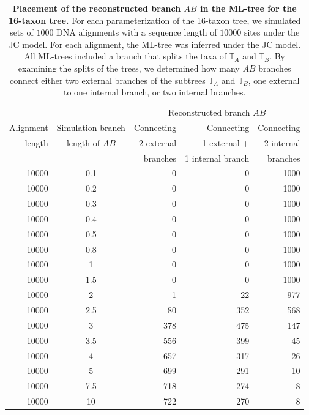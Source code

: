\begin{appendices}
\begin{table}[hb]
    \centering
    \begin{tabular}{|r|c|r|r|r|}
\hline
      &  &\multicolumn{3}{c|}{Reconstructed branch $AB$}\\
Alignment &Simulation branch&   Connecting  & Connecting &  Connecting\\
length &length of $AB$ &     2 external & 1 external +  & 2 internal \\
&&     branches & 1 internal branch & branches\\
\hline
10000 &0.1	&  0	& 0  & 1000 \\
10000 &0.2	&  0	& 0  & 1000 \\
10000 &0.3	&  0	& 0  & 1000 \\
10000 &0.4	&  0	& 0  & 1000 \\
10000 &0.5	&  0	& 0  & 1000 \\
10000 &0.8	&  0   	& 0  & 1000 \\
10000 &1   	&  0   	& 0  & 1000 \\
10000 &1.5	& 0   	& 0  & 1000 \\
10000 &2  	& 1	    &22  &977 \\
10000 &2.5	&80	    &352 &568 \\
10000 &3  	&378	&475  &147 \\
10000 &3.5	&556	&399  &45 \\
10000 &4    &657	&317  &26\\
10000 &5  	&699	&291  &10 \\
10000 &7.5	&718	&274  & 8 \\
10000 &10 	&722	&270  & 8\\
\hline
    \end{tabular}
    \vspace{0.25cm}
    \caption{
        \textbf{Placement of the reconstructed branch $AB$ in the ML-tree for the 16-taxon tree.}
        For each parameterization of the 16-taxon tree, we simulated sets of $1000$ DNA alignments with a sequence length of $10000$ sites under the JC model. For each alignment, the ML-tree was inferred under the JC model. All ML-trees included a branch that splits the taxa of $\mathbb{T}_A$ and $\mathbb{T}_B$. By examining the splits of the trees, we determined how many $AB$ branches connect either two external branches of the subtrees $\mathbb{T}_A$ and $\mathbb{T}_B$, one external to one internal branch, or two internal branches.
   }
    \label{supptab:bonferroni_correction_10000}
    \end{table}\hfill\\
   

\end{appendices}
